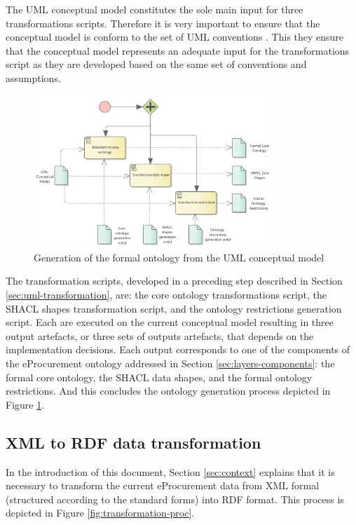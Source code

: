 	The UML conceptual model constitutes the sole main input for three transformations scripts. Therefore it is very important to ensure that the conceptual model is conform to the set of UML conventions \cite{costetchi2020b}. This they ensure that the conceptual model represents an adequate input for the transformations script as they are developed based on the same set of conventions and assumptions.
		
	\begin{figure}[!ht]		
		\centering
		\includegraphics[width=0.8\textwidth]{../img/formalOntologyGeneration.png}
		\caption{Generation of the formal ontology from the UML conceptual model}
		\label{fig:ontology-generation}
	\end{figure}
	
	The transformation scripts, developed in a preceding step described in Section \ref{sec:uml-transformation}, are: the core ontology transformations script, the SHACL shapes transformation script, and the ontology restrictions generation script. Each are executed on the current conceptual model resulting in three output artefacts,  or three sets of outputs artefacts, that depends on the implementation decisions. Each output corresponds to one of the components of the eProcurement ontology addressed in Section \ref{sec:layers-components}: the formal core ontology, the SHACL data shapes, and the formal ontology restrictions. And this concludes the ontology generation process depicted in Figure \ref{fig:ontology-generation}. 	

	\subsection{XML to RDF data transformation}
	\label{sec:xml2rdf}

	In the introduction of this document, Section \ref{sec:context} explains that it is necessary to transform the current eProcurement data from XML formal (structured according to the standard forms) into RDF format. This process is depicted in Figure \ref{fig:transformation-proc}.
	
